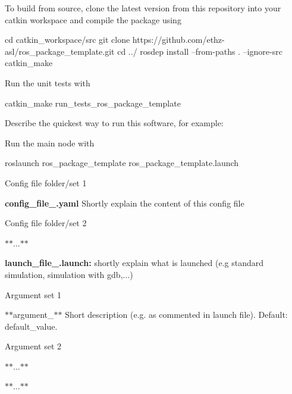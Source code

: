 To build from source, clone the latest version from this repository into your catkin workspace and compile the package using \begin{DoxyVerb}cd catkin_workspace/src
git clone https://github.com/ethz-asl/ros_package_template.git
cd ../
rosdep install --from-paths . --ignore-src
catkin_make
\end{DoxyVerb}


Run the unit tests with \begin{DoxyVerb}catkin_make run_tests_ros_package_template
\end{DoxyVerb}


Describe the quickest way to run this software, for example\+:

Run the main node with \begin{DoxyVerb}roslaunch ros_package_template ros_package_template.launch
\end{DoxyVerb}


Config file folder/set 1


\begin{DoxyItemize}
\item {\bfseries config\+\_\+file\+\_.\+yaml} Shortly explain the content of this config file
\end{DoxyItemize}

Config file folder/set 2


\begin{DoxyItemize}
\item $\ast$$\ast$...$\ast$$\ast$
\end{DoxyItemize}


\begin{DoxyItemize}
\item {\bfseries launch\+\_\+file\+\_.\+launch\+:} shortly explain what is launched (e.\+g standard simulation, simulation with gdb,...)

Argument set 1
\begin{DoxyItemize}
\item $\ast$$\ast${\ttfamily argument\+\_}$\ast$$\ast$ Short description (e.\+g. as commented in launch file). Default\+: {\ttfamily default\+\_\+value}.
\end{DoxyItemize}

Argument set 2
\begin{DoxyItemize}
\item $\ast$$\ast${\ttfamily ...}$\ast$$\ast$
\end{DoxyItemize}
\item $\ast$$\ast$...$\ast$$\ast$
\end{DoxyItemize}

